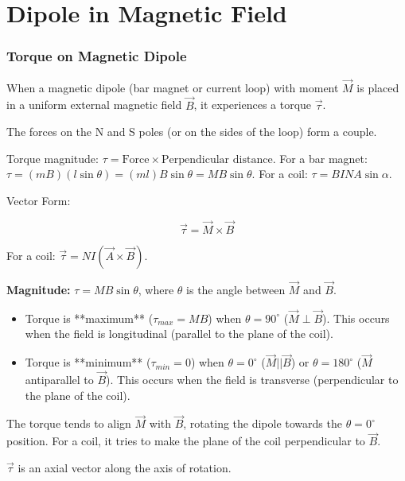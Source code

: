\section{Dipole in Magnetic Field}

\transfade[duration=0.5]

\begin{frame}[t]
    \frametitle{\textcolor{deepnavy}{\textbf{Torque on Magnetic Dipole}}}
    \renewcommand{\familydefault}{\rmdefault}
    \small

      \item<+-> When a magnetic dipole (bar magnet or current loop) with moment $\vec{M}$ is placed in a uniform external magnetic field $\vec{B}$, it experiences a torque $\vec{\tau}$.
      \item<+-> The forces on the N and S poles (or on the sides of the loop) form a couple.
    \item<+-> Torque magnitude: $\tau = \text{Force} \times \text{Perpendicular distance}$.   For a bar magnet: $\tau = (mB)(l \sin\theta) = (ml)B\sin\theta = MB\sin\theta$.   For a coil: $\tau = BINA\sin\alpha$.
    \item<+-> Vector Form:
        \begin{tcolorbox}[colback=orange!8,colframe=accentorange,boxrule=0.5pt,arc=1mm,boxsep=2pt]
        \begin{equation*}
             \vec{\tau} = \vec{M} \times \vec{B}
        \end{equation*}
          \end{tcolorbox}
          For a coil: $\vec{\tau} = NI (\vec{A} \times \vec{B})$.

      \item<+-> \textbf{Magnitude:} $\tau = MB \sin\theta$, where $\theta$ is the angle between $\vec{M}$ and $\vec{B}$.
        \begin{itemize}[<+->]
              \item Torque is **maximum** ($\tau_{max} = MB$) when $\theta = 90^\circ$ ($\vec{M} \perp \vec{B}$).   This occurs when the field is longitudinal (parallel to the plane of the coil).
              \item Torque is **minimum** ($\tau_{min} = 0$) when $\theta = 0^\circ$ ($\vec{M} || \vec{B}$) or $\theta = 180^\circ$ ($\vec{M}$ antiparallel to $\vec{B}$).   This occurs when the field is transverse (perpendicular to the plane of the coil).
        \end{itemize}

      \item<+-> The torque tends to align $\vec{M}$ with $\vec{B}$, rotating the dipole towards the $\theta = 0^\circ$ position.   For a coil, it tries to make the plane of the coil perpendicular to $\vec{B}$.
      \item<+-> $\vec{\tau}$ is an axial vector along the axis of rotation.
\end{frame}

